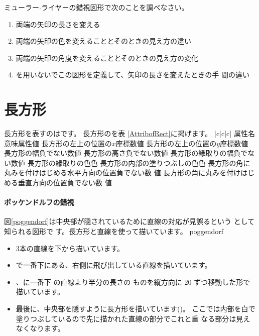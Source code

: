 \begin{Problem}\upshape
ミューラー$\cdot$ライヤーの錯視図形で次のことを調べなさい。
\begin{enumerate}
 \item 両端の矢印の長さを変える
 \item 両端の矢印の色を変えることとそのときの見え方の違い
 \item 両端の矢印の角度を変えることとそのときの見え方の変化
 \item {}を用いないでこの図形を定義して、矢印の長さを変えたときの手
       間の違い
\end{enumerate}
\end{Problem}
\section{長方形}
長方形を表すのはです。
長方形のを表
       \ref{AttribofRect}に掲げます。
{|c|c|c|}{%
{属性名}{意味}{属性値}
{}{長方形の左上の位置の$x$座標}{数値}
{}{長方形の左上の位置の$y$座標}{数値}
{}{長方形の幅}{負でない数値}
{}{長方形の高さ}{負でない数値}
{}{長方形の縁取りの幅}{負でない数値}
{}{長方形の縁取りの色}{色}
{}{長方形の内部の塗りつぶしの色}{色}
{}{長方形の角に丸みを付けはじめる水平方向の位置}{負でない数
値}
{}{長方形の角に丸みを付けはじめる垂直方向の位置}{負でない数
値}
}
\paragraph{ポッケンドルフの錯視}
 図\ref{poggendorf}は中央部が隠されているために直線の対応が見誤るという
として知られる図形で
 す。長方形と直線を使って描いています。
{poggendorf}
\begin{itemize}
 \item 3本の直線を下から描いています。
 \item {}%
       で一番下にある、右側に飛び出している直線を描いています。
 \item {}、に一番下
       の直線より半分の長さの
       ものを縦方向に $20$ ずつ移動した形で描いています。
 \item 最後に、中央部を隠すように長方形を描いています()。
       ここでは内部を白で塗りつぶしているので先に描かれた直線の部分でこれと重
       なる部分は見えなくなります。
\end{itemize}

